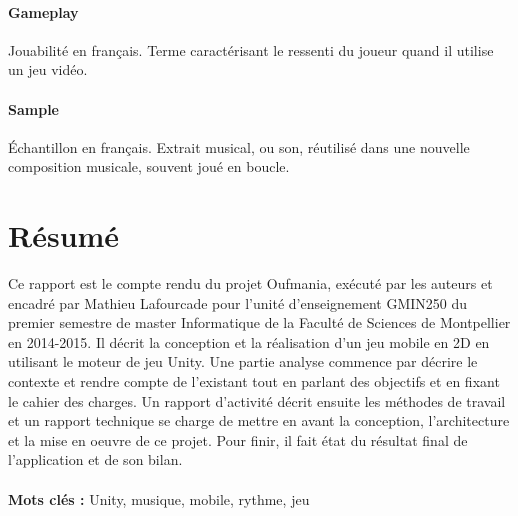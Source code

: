 \documentclass [a4 paper,11pt]{report}
\begin{document}
\paragraph{Gameplay} Jouabilité en français. Terme caractérisant le ressenti du joueur quand il utilise un jeu vidéo.

\paragraph{Sample} Échantillon en français. Extrait musical, ou son, réutilisé dans une nouvelle composition musicale, souvent joué en boucle.

\paragraph{}



\newpage




\newpage



\newpage



\newpage



\newpage



\newpage



\newpage
\pagestyle{empty}
\section*{Résumé}
Ce rapport est le compte rendu du projet Oufmania, exécuté par les auteurs et encadré par Mathieu Lafourcade pour l'unité d'enseignement GMIN250 du premier semestre de master Informatique de la Faculté de Sciences de Montpellier en 2014-2015. Il décrit la conception et la réalisation d'un jeu mobile en 2D en utilisant le moteur de jeu Unity. Une partie analyse commence par décrire le contexte et rendre compte de l'existant tout en parlant des objectifs et en fixant le cahier des charges. Un rapport d'activité décrit ensuite les méthodes de travail et un rapport technique se charge de mettre en avant la conception, l'architecture et la mise en oeuvre de ce projet. Pour finir, il fait état du résultat final de l'application et de son bilan.
\\\\
\textbf{Mots clés : } Unity, musique, mobile, rythme, jeu
\end{document}
